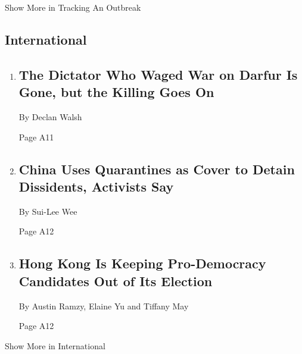 Show More in Tracking An Outbreak

\hypertarget{international}{%
\subsection{International}\label{international}}

\begin{enumerate}
\def\labelenumi{\arabic{enumi}.}
\item
  \href{/2020/07/30/world/middleeast/darfur-sudan.html}{}

  \hypertarget{the-dictator-who-waged-war-on-darfur-is-gone-but-the-killing-goes-on-1}{%
  \subsection{The Dictator Who Waged War on Darfur Is Gone, but the
  Killing Goes
  On}\label{the-dictator-who-waged-war-on-darfur-is-gone-but-the-killing-goes-on-1}}

  By Declan Walsh

  Page A11
\item
  \href{/2020/07/30/world/asia/coronavirus-china-quarantine.html}{}

  \hypertarget{china-uses-quarantines-as-cover-to-detain-dissidents-activists-say}{%
  \subsection{China Uses Quarantines as Cover to Detain Dissidents,
  Activists
  Say}\label{china-uses-quarantines-as-cover-to-detain-dissidents-activists-say}}

  By Sui-Lee Wee

  Page A12
\item
  \href{/2020/07/29/world/asia/hong-kong-arrests-security-law.html}{}

  \hypertarget{hong-kong-is-keeping-pro-democracy-candidates-out-of-its-election}{%
  \subsection{Hong Kong Is Keeping Pro-Democracy Candidates Out of Its
  Election}\label{hong-kong-is-keeping-pro-democracy-candidates-out-of-its-election}}

  By Austin Ramzy, Elaine Yu and Tiffany May

  Page A12
\end{enumerate}

Show More in International


